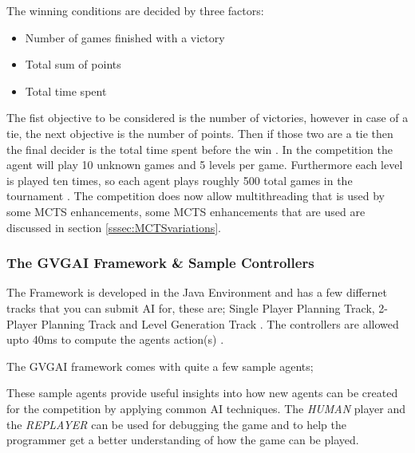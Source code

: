 \documentclass[journal]{IEEEtran}
\begin{document}
		The winning conditions are decided by three factors:
		\begin{itemize}
		    \item Number of games finished with a victory
		    \item Total sum of points
		    \item Total time spent
		\end{itemize}
		The fist objective to be considered is the number of victories, however in case of a tie, the next objective is the number of points. Then if those two are a tie then the final decider is the total time spent before the win \cite{perez20162014}.
		In the competition the agent will play 10 unknown games and 5 levels per game. Furthermore each level is played ten times, so each agent plays roughly 500 total games in the tournament \cite{schuster2015mcts}.
		The competition does now allow multithreading that is used by some MCTS enhancements, some MCTS enhancements that are used are discussed in section \ref{sssec:MCTSvariations}.
	
	
	\subsubsection{The GVGAI Framework \& Sample Controllers}
		The Framework is developed in the Java Environment and has a few differnet tracks that you can submit AI for, these are; Single Player Planning Track, 2-Player Planning Track and Level Generation Track \cite{gaina2016general}.
		The controllers are allowed upto 40ms to compute the agents action(s) \cite{perez2016GVGAICompetition, GVGAI}.
		
		The GVGAI framework comes with quite a few sample agents;
		

		These sample agents provide useful insights into how new agents can be created for the competition by applying common AI techniques.
		The \textit{HUMAN} player and the \textit{REPLAYER} can be used for debugging the game and to help the programmer get a better understanding of how the game can be played.
		
\end{document}
